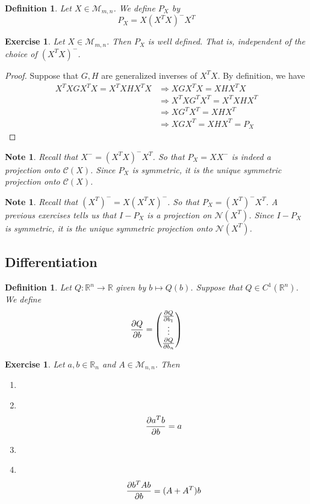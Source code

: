\documentclass[12pt]{amsart}
\newcommand\Item[1][]{%
  \ifx\relax#1\relax  \item \else \item[#1] \fi
  \abovedisplayskip=0pt\abovedisplayshortskip=0pt~\vspace*{-\baselineskip}}
\newtheorem{defn}[thm]{Definition}
\newtheorem{note}[thm]{Note}
\newtheorem{ex}[thm]{Exercise}
\newcommand{\R}{\mathbb{R}}
\newcommand{\MC}{\mathcal{C}}
\newcommand{\MN}{\mathcal{N}}
\newcommand{\MM}{\mathcal{M}}
\newcommand{\z}[1]{Let ${#1} \in \MM_{m,n}$}
\begin{document}
\begin{defn}
\z{X}. We define $P_X$ by $$P_X = X (X^TX)^-X^T$$
\end{defn}

\begin{ex}
\z{X}. Then $P_X$ is well defined. That is, independent of the choice of $(X^TX)^-$.
\end{ex}

\begin{proof}
Suppose that $G, H$ are generalized inverses of $X^TX$. By definition, we have 
\begin{align*}
X^TXGX^TX = X^TXHX^TX 
& \Rightarrow XGX^TX = XHX^TX \\
& \Rightarrow X^TXG^TX^T = X^TXHX^T \\
& \Rightarrow XG^TX^T = XHX^T \\
& \Rightarrow XGX^T = XHX^T = P_X
\end{align*}
\end{proof}

\begin{note}
Recall that $X^- = (X^TX)^-X^T$. So that $P_X = XX^-$ is indeed a projection onto $\MC(X)$. Since $P_X$ is symmetric, it is the unique symmetric projection onto $\MC(X)$. 
\end{note}

\begin{note}
Recall that $(X^T)^- = X(X^TX)^-$. So that $P_X = (X^T)^-X^T$. A previous exercises tells us that $I-P_X$ is a projection on $\MN(X^T)$. Since $I-P_X$ is symmetric, it is the unique symmetric projection onto $\MN(X^T)$.
\end{note}

\subsection{Differentiation}

\begin{defn}
Let $Q:\R^n \rightarrow \R$ given by $b \mapsto Q(b)$. Suppose that $Q \in C^1(\R^n)$.  We define 
\[ 
\pdv{Q}{b}= 
\begin{pmatrix} 
\pdv{Q}{b_1}  \\
\vdots\\
\pdv{Q}{b_n}
\end{pmatrix}  
\]
\end{defn}

\begin{ex}
Let $a, b  \in \R_n$ and $A \in \MM_{n, n}$. Then \vspace{2mm}
\begin{enumerate}
\Item $$\pdv{a^Tb}{b} = a$$ \vspace{2mm}
\Item $$\pdv{b^T A b}{b} = (A+A^T)b$$
\end{enumerate} 
\end{ex}
\end{document}
